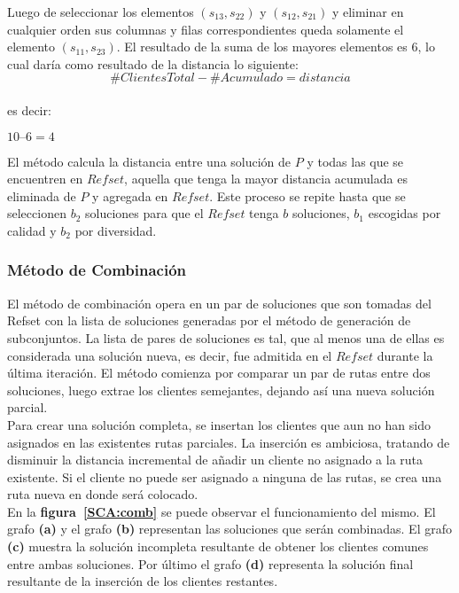 Luego de seleccionar los elementos $(s_{13},s_{22})$ y $(s_{12},s_{21})$ y eliminar en cualquier orden sus columnas y filas co\-rres\-pon\-dien\-tes queda solamente el elemento $(s_{11},s_{23})$. El resultado de la suma de los mayores elementos es 6, lo cual daría como resultado de la distancia lo siguiente:\\

\begin{equation}
\# ClientesTotal - \# Acumulado = distancia 
\end{equation}
\\ 
es decir:
\\
\begin{center}
$10 – 6 = 4$
\end{center}

El método calcula la distancia entre una solución de $P$ y todas las que se encuentren en $Refset$, aquella que tenga la mayor distancia acumulada es eliminada de $P$ y agregada en $Refset$. Este proceso se repite hasta que se seleccionen $b_{2}$ soluciones para que el $Refset$ tenga $b$ soluciones, $b_{1}$ escogidas por calidad y $b_{2}$ por diversidad.

\subsubsection*{Método de Combinación}

El método de combinación opera en un par de soluciones que son tomadas del Refset con la lista de soluciones generadas por el método de generación de subconjuntos. La lista de pares de soluciones es tal, que al menos una de ellas es considerada una solución nueva, es decir, fue admitida en el $Refset$ durante la última iteración.  El método comienza por comparar un par de rutas entre dos soluciones, luego extrae los clientes semejantes, dejando así una nueva solución parcial.\\
 
Para crear una solución completa, se insertan los clientes que aun no han sido asignados en las existentes rutas parciales. La inserción es ambiciosa, tratando de disminuir la distancia incremental de añadir un cliente no asignado a la ruta existente. Si el cliente no puede ser asignado a ninguna de las rutas, se crea una ruta nueva en donde será colocado.\\

En la \textbf{figura~\ref{SCA:comb}} se puede observar el funcionamiento del mismo. El grafo \textbf{(a)} y el grafo \textbf{(b)} representan  las soluciones que serán combinadas. El grafo \textbf{(c)} muestra la solución incompleta resultante de obtener los clientes comunes entre ambas soluciones. Por último el grafo \textbf{(d)} representa la solución final resultante de la inserción de los clientes restantes.


